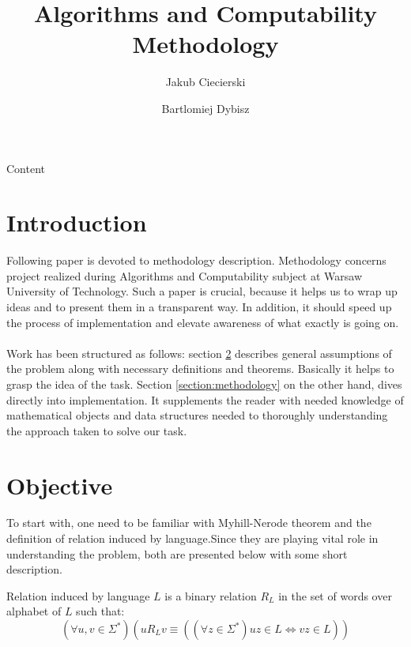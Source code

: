 \documentclass[runningheads,a4paper]{llncs}
\begin{document}
\vspace{-100pt}
\mainmatter

\title{Algorithms and Computability \\Methodology}


\author{Jakub Ciecierski \and Bartlomiej Dybisz}




\maketitle

\abstract{} Content \\


\section{Introduction}
Following paper is devoted to methodology description. Methodology concerns project realized during Algorithms and Computability subject at Warsaw University of Technology. Such a paper is crucial, because it helps us to wrap up ideas and to present them in a transparent way. In addition, it should speed up the process of implementation and elevate awareness of what exactly is going on.
\paragraph{}
Work has been structured as follows: section \ref{section:objectives} describes general assumptions of the problem along with necessary definitions and theorems. Basically it helps to grasp the idea of the task.
Section \ref{section:methodology} on the other hand, dives directly into implementation. It supplements the reader with needed knowledge of mathematical objects and data structures needed to thoroughly understanding the approach taken to solve our task. 

\section{Objective} \label{section:objectives}
To start with, one need to be familiar with Myhill-Nerode theorem and the definition of relation induced by language.Since they are playing vital role in understanding the problem, both are presented below with some short description. 
\begin{definition}
Relation induced by language $L$ is a binary relation $R_{L}$ in the set of words over alphabet of $L$ such that:
\[
(\forall{u,v \in \Sigma^{*}})(u R_{L} v \equiv ((\forall z \in \Sigma^{*}) uz \in L \Leftrightarrow vz \in L))
\]
\end{definition}
\end{document}
